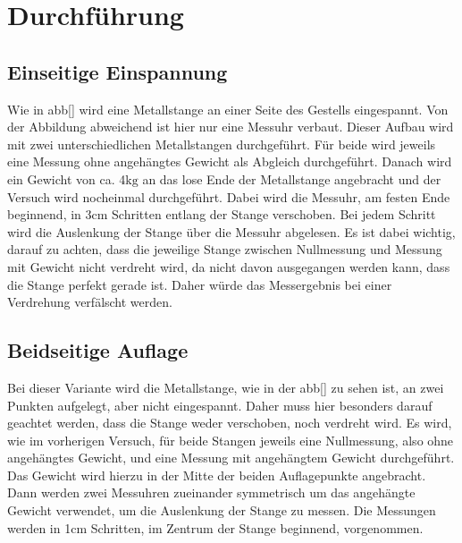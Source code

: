 \section{Durchführung}
\label{sec:Durchführung}

\subsection{Einseitige Einspannung}

Wie in abb[] wird eine Metallstange an einer Seite des Gestells eingespannt. Von der Abbildung abweichend ist hier nur eine Messuhr
verbaut. Dieser Aufbau wird mit zwei unterschiedlichen Metallstangen durchgeführt. Für beide wird jeweils eine Messung ohne angehängtes
Gewicht als Abgleich durchgeführt. Danach wird ein Gewicht von ca. 4$\si{\kilo\gram}$ an das lose Ende der Metallstange angebracht und 
der Versuch wird nocheinmal durchgeführt. Dabei wird die Messuhr, am festen Ende beginnend, in 3$\si{\centi\meter}$ Schritten entlang der 
Stange verschoben. Bei jedem Schritt wird die Auslenkung der Stange über die Messuhr abgelesen. Es ist dabei wichtig, darauf zu achten,
dass die jeweilige Stange zwischen Nullmessung und Messung mit Gewicht nicht verdreht wird, da nicht davon ausgegangen werden kann, dass 
die Stange perfekt gerade ist. Daher würde das Messergebnis bei einer Verdrehung verfälscht werden. 

\subsection{Beidseitige Auflage}

Bei dieser Variante wird die Metallstange, wie in der abb[] zu sehen ist, an zwei Punkten aufgelegt, aber nicht eingespannt. Daher muss 
hier besonders darauf geachtet werden, dass die Stange weder verschoben, noch verdreht wird. Es wird, wie im vorherigen Versuch, für 
beide Stangen jeweils eine Nullmessung, also ohne angehängtes Gewicht, und eine Messung mit angehängtem Gewicht durchgeführt.
Das Gewicht wird hierzu in der Mitte der beiden Auflagepunkte angebracht. Dann werden zwei Messuhren zueinander symmetrisch um das 
angehängte Gewicht verwendet, um die Auslenkung der Stange zu messen. Die Messungen werden in 1$\si{\centi\meter}$ Schritten, im Zentrum 
der Stange beginnend, vorgenommen. 